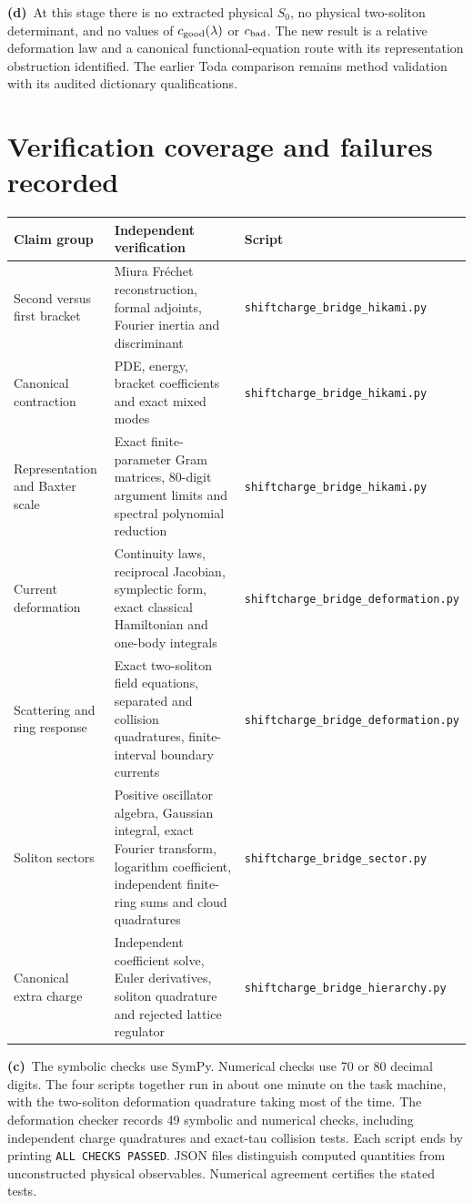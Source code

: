\documentclass[11pt,a4paper]{article}
\newcommand{\C}{\textbf{(c)}\ }
\newcommand{\D}{\textbf{(d)}\ }
\newcommand{\file}[1]{\nolinkurl{#1}}
\newcommand{\hk}{\file{shiftcharge_bridge_hikami.py}}
\newcommand{\df}{\file{shiftcharge_bridge_deformation.py}}
\newcommand{\scs}{\file{shiftcharge_bridge_sector.py}}
\newcommand{\hy}{\file{shiftcharge_bridge_hierarchy.py}}
\begin{document}
\D At this stage there is no extracted physical $S_0$, no physical
two-soliton determinant, and no values of $c_{\rm good}(\lambda)$ or
$c_{\rm bad}$. The new result is a relative deformation law and a canonical
functional-equation route with its representation obstruction identified.
The earlier Toda comparison remains method validation with its audited
dictionary qualifications.

\section{Verification coverage and failures recorded}
\small
\begin{longtable}{@{}L{4.0cm}L{6.4cm}L{4.6cm}@{}}
\toprule
Claim group & Independent verification & Script\\
\midrule\endhead
Second versus first bracket & Miura Fr\'echet reconstruction, formal adjoints,
Fourier inertia and discriminant & \hk\\
Canonical contraction & PDE, energy, bracket coefficients and exact mixed modes &
\hk\\
Representation and Baxter scale & Exact finite-parameter Gram matrices,
80-digit argument limits and spectral polynomial reduction & \hk\\
Current deformation & Continuity laws, reciprocal Jacobian, symplectic form,
exact classical Hamiltonian and one-body integrals & \df\\
Scattering and ring response & Exact two-soliton field equations, separated
and collision quadratures, finite-interval boundary currents & \df\\
Soliton sectors & Positive oscillator algebra, Gaussian integral, exact Fourier transform, logarithm
coefficient, independent finite-ring sums and cloud quadratures & \scs\\
Canonical extra charge & Independent coefficient solve, Euler derivatives,
soliton quadrature and rejected lattice regulator & \hy\\
\bottomrule
\end{longtable}
\normalsize

\C The symbolic checks use SymPy. Numerical checks use 70 or 80 decimal
digits. The four scripts together run in about one minute on the
task machine, with the two-soliton deformation quadrature taking most of
the time. The deformation checker records 49 symbolic and numerical
checks, including independent charge quadratures and exact-tau
collision tests. Each script ends by printing \texttt{ALL CHECKS PASSED}.
JSON files distinguish computed quantities from unconstructed physical
observables. Numerical agreement certifies the stated tests.
\end{document}
